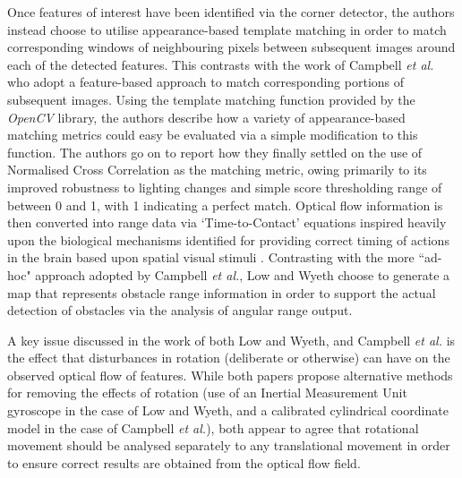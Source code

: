 
Once features of interest have been identified via the corner detector, the authors instead choose to utilise appearance-based template matching in order to match corresponding windows of neighbouring pixels between subsequent images around each of the detected features. This contrasts with the work of Campbell \textit{et al.} \cite{campbell} who adopt a feature-based approach to match corresponding portions of subsequent images. Using the template matching function provided by the \textit{OpenCV} library, the authors describe how a variety of appearance-based matching metrics could easy be evaluated via a simple modification to this function. The authors go on to report how they finally settled on the use of Normalised Cross Correlation as the matching metric, owing primarily to its improved robustness to lighting changes and simple score thresholding range of between 0 and 1, with 1 indicating a perfect match. Optical flow information is then converted into range data via `Time-to-Contact' equations inspired heavily upon the biological mechanisms identified for providing correct timing of actions in the brain based upon spatial visual stimuli \cite{lee-young}. Contrasting with the more ``ad-hoc" approach adopted by Campbell \textit{et al.}, Low and Wyeth choose to generate a map that represents obstacle range information in order to support the actual detection of obstacles via the analysis of angular range output. 

A key issue discussed in the work of both Low and Wyeth, and Campbell \textit{et al.} is the effect that disturbances in rotation (deliberate or otherwise) can have on the observed optical flow of features. While both papers propose alternative methods for removing the effects of rotation (use of an Inertial Measurement Unit gyroscope in the case of Low and Wyeth, and a calibrated cylindrical coordinate model in the case of Campbell \textit{et al.}), both appear to agree that rotational movement should be analysed separately to any translational movement in order to ensure correct results are obtained from the optical flow field. 

